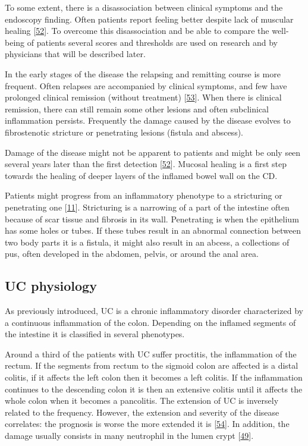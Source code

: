 \documentclass[
  12pt,
  a4paper,
  twoside,
  openright]{book}
\begin{document}
To some extent, there is a disassociation between clinical symptoms and the endoscopy finding.
Often patients report feeling better despite lack of muscular healing {[}\protect\hyperlink{ref-bhattacharya2016}{52}{]}.
To overcome this disassociation and be able to compare the well-being of patients several scores and thresholds are used on research and by physicians that will be described later.

In the early stages of the disease the relapsing and remitting course is more frequent.
Often relapses are accompanied by clinical symptoms, and few have prolonged clinical remission (without treatment) {[}\protect\hyperlink{ref-peyrin-biroulet2010}{53}{]}.
When there is clinical remission, there can still remain some other lesions and often subclinical inflammation persists.
Frequently the damage caused by the disease evolves to fibrostenotic stricture or penetrating lesions (fistula and abscess).

Damage of the disease might not be apparent to patients and might be only seen several years later than the first detection {[}\protect\hyperlink{ref-bhattacharya2016}{52}{]}.
Mucosal healing is a first step towards the healing of deeper layers of the inflamed bowel wall on the CD.

Patients might progress from an inflammatory phenotype to a stricturing or penetrating one {[}\protect\hyperlink{ref-satsangi2006}{11}{]}.
Stricturing is a narrowing of a part of the intestine often because of scar tissue and fibrosis in its wall.
Penetrating is when the epithelium has some holes or tubes.
If these tubes result in an abnormal connection between two body parts it is a fistula, it might also result in an abcess, a collections of pus, often developed in the abdomen, pelvis, or around the anal area.

\hypertarget{UC}{%
\subsection{UC physiology}\label{UC}}

As previously introduced, UC is a chronic inflammatory disorder characterized by a continuous inflammation of the colon.
Depending on the inflamed segments of the intestine it is classified in several phenotypes.

Around a third of the patients with UC suffer proctitis, the inflammation of the rectum.
If the segments from rectum to the sigmoid colon are affected is a distal colitis, if it affects the left colon then it becomes a left colitis.
If the inflammation continues to the descending colon it is then an extensive colitis until it affects the whole colon when it becomes a pancolitis.
The extension of UC is inversely related to the frequency.
However, the extension and severity of the disease correlates: the prognosis is worse the more extended it is {[}\protect\hyperlink{ref-etchevers2009}{54}{]}.
In addition, the damage usually consists in many neutrophil in the lumen crypt {[}\protect\hyperlink{ref-bassolasmolina2018}{49}{]}.
\end{document}
